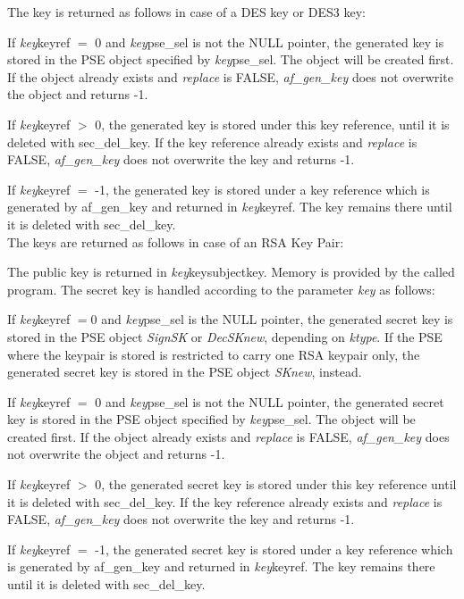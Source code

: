 \ei

The key is returned as follows in case of a DES key or DES3 key:

If {\em key}\pf keyref $=$ 0 and {\em key}\pf pse\_sel is not the NULL pointer, the generated key
is stored in the PSE object specified by {\em key}\pf pse\_sel. The object will be
created first. 
If the object already exists and {\em replace} is FALSE, {\em af\_gen\_key}
does not overwrite the object and returns -1.
 
If {\em key}\pf keyref $>$ 0, the generated key is stored under this key reference, until it is
deleted with sec\_del\_key. 
If the key reference already exists and {\em replace} is FALSE, {\em af\_gen\_key}
does not overwrite the key and returns -1.
 
If {\em key}\pf keyref $=$ -1, the generated key is stored under a key reference which is generated 
by af\_gen\_key and returned in {\em key}\pf keyref. The key remains there until it is deleted
with sec\_del\_key. \\ [0.5cm]
The keys are returned as follows in case of an RSA Key Pair:

The public key is returned in {\em key}\pf key\pf subjectkey. Memory is provided by the called program.
The secret key is handled according to the parameter {\em key} as follows: 

If {\em key}\pf keyref $= 0$ and {\em key}\pf pse\_sel is the NULL pointer, the
generated secret key is stored in the PSE object {\em SignSK} or
{\em DecSKnew}, depending on {\em ktype}. 
If the PSE where the keypair is stored is restricted to carry one RSA keypair only, 
the generated secret key is stored in the PSE object {\em SKnew}, instead.

If {\em key}\pf keyref $=$ 0 and {\em key}\pf pse\_sel is not the NULL pointer, the generated secret key
is stored in the PSE object specified by {\em key}\pf pse\_sel. The object will be
created first. 
If the object already exists and {\em replace} is FALSE, {\em af\_gen\_key}
does not overwrite the object and returns -1.
 
If {\em key}\pf keyref $>$ 0, the generated secret key is stored under this key reference until it is
deleted with sec\_del\_key. 
If the key reference already exists and {\em replace} is FALSE, {\em af\_gen\_key}
does not overwrite the key and returns -1.
 
If {\em key}\pf keyref $=$ -1, the generated secret key is stored under a key reference which is generated 
by af\_gen\_key and returned in {\em key}\pf keyref. The key remains there until it is deleted
with sec\_del\_key.

